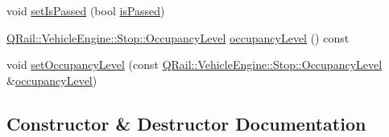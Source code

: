 \begin{DoxyCompactItemize}
\item 
void \mbox{\hyperlink{classQRail_1_1RouterEngine_1_1RouteLegEnd_a1d5f8956cbbee5b910f74d8ec05d83d8}{set\+Is\+Passed}} (bool \mbox{\hyperlink{classQRail_1_1RouterEngine_1_1RouteLegEnd_a0ecabab3a1a0a3c5df1174ace72bb153}{is\+Passed}})
\item 
\mbox{\hyperlink{classQRail_1_1VehicleEngine_1_1Stop_ad967ed81b19762bd582c1af07354a6d4}{Q\+Rail\+::\+Vehicle\+Engine\+::\+Stop\+::\+Occupancy\+Level}} \mbox{\hyperlink{classQRail_1_1RouterEngine_1_1RouteLegEnd_abd30361deee8efe206cd65444baf15c5}{occupancy\+Level}} () const
\item 
void \mbox{\hyperlink{classQRail_1_1RouterEngine_1_1RouteLegEnd_a42dfd2ffdc3ec201dbb30f73f6e4e764}{set\+Occupancy\+Level}} (const \mbox{\hyperlink{classQRail_1_1VehicleEngine_1_1Stop_ad967ed81b19762bd582c1af07354a6d4}{Q\+Rail\+::\+Vehicle\+Engine\+::\+Stop\+::\+Occupancy\+Level}} \&\mbox{\hyperlink{classQRail_1_1RouterEngine_1_1RouteLegEnd_abd30361deee8efe206cd65444baf15c5}{occupancy\+Level}})
\end{DoxyCompactItemize}


\subsection{Constructor \& Destructor Documentation}
\mbox{\label{classQRail_1_1RouterEngine_1_1RouteLegEnd_a7eb21b6bdb3966a8954e1b870ae6e5ce}} 
